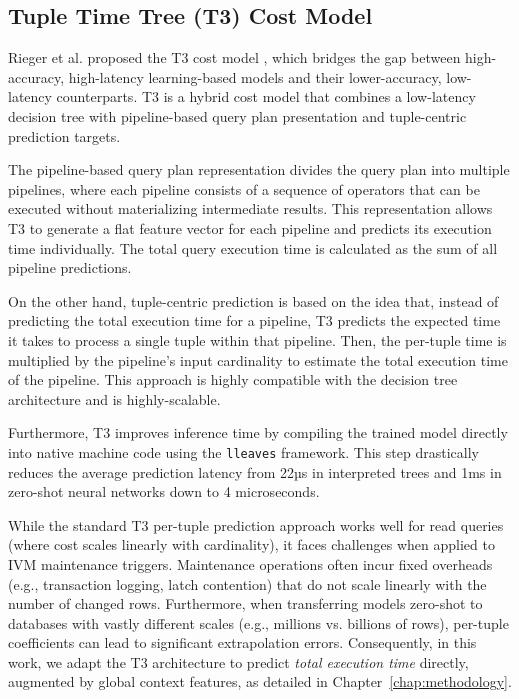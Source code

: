 \subsection{Tuple Time Tree (T3) Cost Model}
Rieger et al. proposed the \ac{T3} cost model \cite{rieger2025t3}, which bridges the gap between high-accuracy, high-latency learning-based models and their lower-accuracy, low-latency counterparts. \ac{T3} is a hybrid cost model that combines a low-latency decision tree with pipeline-based query plan presentation and tuple-centric prediction targets.

The pipeline-based query plan representation divides the query plan into multiple pipelines, where each pipeline consists of a sequence of operators that can be executed without materializing intermediate results. This representation allows \ac{T3} to generate a flat feature vector for each pipeline and predicts its execution time individually. The total query execution time is calculated as the sum of all pipeline predictions.

On the other hand, tuple-centric prediction is based on the idea that, instead of predicting the total execution time for a pipeline, \ac{T3} predicts the expected time it takes to process a single tuple within that pipeline. Then, the per-tuple time is multiplied by the pipeline's input cardinality to estimate the total execution time of the pipeline. This approach is highly compatible with the decision tree architecture and is highly-scalable.

Furthermore, \ac{T3} improves inference time by compiling the trained model directly into native machine code using the \texttt{lleaves} framework. This step drastically reduces the average prediction latency from 22µs in interpreted trees and 1ms in zero-shot neural networks down to 4 microseconds.

While the standard \ac{T3} per-tuple prediction approach works well for read queries (where cost scales linearly with cardinality), it faces challenges when applied to \ac{IVM} maintenance triggers. Maintenance operations often incur fixed overheads (e.g., transaction logging, latch contention) that do not scale linearly with the number of changed rows. Furthermore, when transferring models zero-shot to databases with vastly different scales (e.g., millions vs. billions of rows), per-tuple coefficients can lead to significant extrapolation errors. Consequently, in this work, we adapt the T3 architecture to predict \textit{total execution time} directly, augmented by global context features, as detailed in Chapter~\ref{chap:methodology}.

